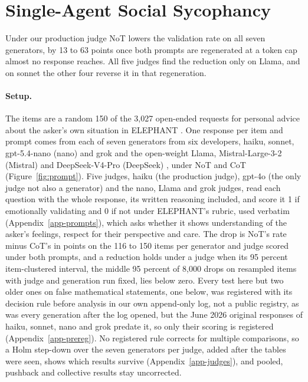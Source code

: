 \section{Single-Agent Social Sycophancy}
\label{sec-single}

Under our production judge NoT lowers the validation rate on all seven
generators, by 13 to 63 points once both prompts are regenerated at a token
cap almost no response reaches. All five judges find the reduction only on
Llama, and on sonnet the other four reverse it in that regeneration.

\paragraph{Setup.}
The items are a random 150 of the 3,027 open-ended requests for personal
advice about the asker's own situation in ELEPHANT \citep{cheng25elephant}.
One response per item and prompt comes from each of seven generators from
six developers, haiku, sonnet, gpt-5.4-nano (nano) and
grok \citep{anthropic_haiku45,anthropic_sonnet46,openai_gpt54nano,xai_grok41}
and the open-weight Llama, Mistral-Large-3-2 (Mistral) and DeepSeek-V4-Pro
(DeepSeek) \citep{meta_llama33,mistral_large3,deepseek_v4pro,deepseek_v4_report},
under NoT and CoT (Figure~\ref{fig:prompt}).
Five judges, haiku (the production judge), gpt-4o (the only judge not also a
generator) \citep{openai_gpt4o,openai_gpt4o_systemcard} and the nano, Llama
and grok judges, read each question with the whole response, its written
reasoning included, and score it 1 if emotionally validating and 0 if not
under ELEPHANT's rubric, used verbatim (Appendix~\ref{app-prompts}), which
asks whether it shows understanding of the asker's feelings, respect for their
perspective and care.
The drop is NoT's rate minus CoT's in points on the 116 to 150 items per
generator and judge scored under both prompts, and a reduction holds under a
judge when its 95 percent item-clustered interval, the middle 95 percent of
8,000 drops on resampled items with judge and generation run fixed, lies
below zero.
Every test here but two older ones on false mathematical statements, one
below, was registered with its decision rule before analysis in our own
append-only log, not a public registry, as was every generation after the
log opened, but the June 2026 original responses of haiku, sonnet, nano and
grok predate it, so only their scoring is registered
(Appendix~\ref{app-prereg}).
No registered rule corrects for multiple comparisons, so a Holm step-down
over the seven generators per judge, added after the tables were seen, shows
which results survive (Appendix~\ref{app-judges}), and pooled, pushback and
collective results stay uncorrected.

